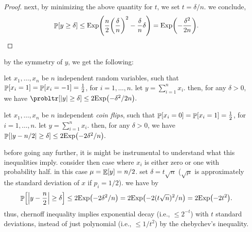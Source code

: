 \begin{proof}
    next, by minimizing the above quantity for $t$, we set $t =
    \delta/n$. we conclude,
    \begin{align*}
        \Prob{ y \geq \delta } \leq \Exp
        \pth{\frac{n}{2}\pth{\frac{\delta}{n}}^2 -
           \frac{\delta}{n}\delta} = \Exp \pth{- \frac{\delta^2}{2n}}.
    \end{align*}
\end{proof}

by the symmetry of $y$, we get the following:
\begin{corollary}
    let $x_1, \ldots, x_n$ be $n$ independent random variables, such
    that $\Prob{x_i =1} =\Prob{x_i=-1} = \frac{1}{2}$, for
    $i=1,\ldots, n$. let $y = \sum_{i=1}^n x_i$. then, for any $\delta
    >0$, we have
    \begin{math}
        \probltr[ \cardin{y} \geq \delta ] \leq
        2\Exp\pth{-\delta^2/2n}.
    \end{math}
\end{corollary}

\begin{fragment}{}
\begin{corollary}
    let $x_1, \ldots, x_n$ be $n$ independent \emph{coin flips}, such
    that $\Prob{x_i =0} =\Prob{x_i=1} = \frac{1}{2}$, for $i=1,\ldots,
    n$. let $y = \sum_{i=1}^n x_i$. then, for any $\delta >0$, we have
    \begin{math}
        \Prob{\cardin{y - {n}/{2}} \geq \delta } \leq 2\Exp
        \pth{-2\delta^2/n}.
  \end{math}
\end{corollary}
\end{fragment}

\begin{remark}
    before going any further, it is might be instrumental to
    understand what this inequalities imply.  consider then case where
    $x_i$ is either zero or one with probability half. in this case
    $\mu = \mathop{\mathbb{E}}\!\left[ {y} \right] = n/2$. set $\delta = t\sqrt{n}$ ($\sqrt{\mu}$ is
    approximately the standard deviation of $x$ if $p_i = 1/2$).  we
    have by
    \begin{align*}
        \Prob{\cardin{y - \frac{n}{2}} \geq \delta } \leq 2\Exp
        \pth{-2\delta^2/n} = 2\Exp \pth{-2(t\sqrt{n})^2/n} = 2\Exp
        \pth{-2 t^2}.
    \end{align*}
    thus, chernoff inequality implies exponential decay (i.e., $\leq
    2^{-t}$) with $t$ standard deviations, instead of just polynomial
    (i.e., $\leq 1/t^2$) by the chebychev's inequality.
\end{remark}





